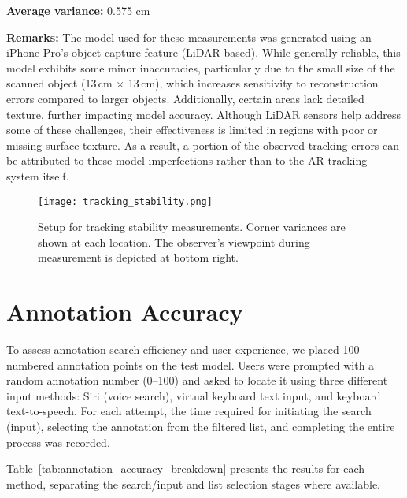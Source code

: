 \noindent
\textbf{Average variance:} 0.575 cm

\vspace{1em}

\noindent
\textbf{Remarks:}
The model used for these measurements was generated using an iPhone Pro's object capture feature (LiDAR-based). While generally reliable, this model exhibits some minor inaccuracies, particularly due to the small size of the scanned object (13\,cm $\times$ 13\,cm), which increases sensitivity to reconstruction errors compared to larger objects. Additionally, certain areas lack detailed texture, further impacting model accuracy. Although LiDAR sensors help address some of these challenges, their effectiveness is limited in regions with poor or missing surface texture. As a result, a portion of the observed tracking errors can be attributed to these model imperfections rather than to the AR tracking system itself.

\begin{figure}[h!]
    \centering
    \texttt{[image: tracking\_stability.png]}
    \caption{Setup for tracking stability measurements. Corner variances are shown at each location. The observer's viewpoint during measurement is depicted at bottom right.}
    \label{fig:tracking_measurement}
\end{figure}
\section{Annotation Accuracy}

To assess annotation search efficiency and user experience, we placed 100 numbered annotation points on the test model. Users were prompted with a random annotation number (0–100) and asked to locate it using three different input methods: Siri (voice search), virtual keyboard text input, and keyboard text-to-speech. For each attempt, the time required for initiating the search (input), selecting the annotation from the filtered list, and completing the entire process was recorded.

Table~\ref{tab:annotation_accuracy_breakdown} presents the results for each method, separating the search/input and list selection stages where available.


